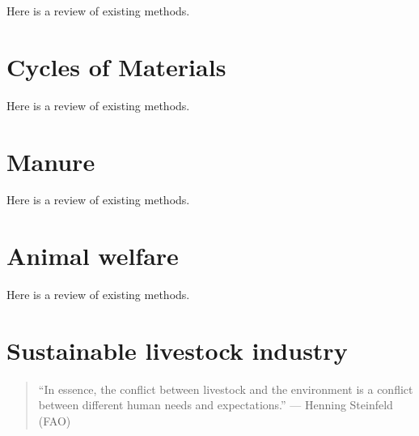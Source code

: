 \documentclass[]{book}
\begin{document}
Here is a review of existing methods.

\chapter{Cycles of Materials}\label{cycles-of-materials}

Here is a review of existing methods.

\chapter{Manure}\label{manure}

Here is a review of existing methods.

\chapter{Animal welfare}\label{animal-welfare}

Here is a review of existing methods.

\chapter{Sustainable livestock
industry}\label{sustainable-livestock-industry}

\begin{quote}
``In essence, the conflict between livestock and the environment is a
conflict between different human needs and expectations.'' --- Henning
Steinfeld (FAO)
\end{quote}


\end{document}
